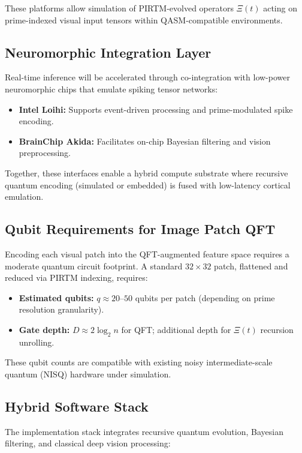 \documentclass[12pt]{article}
\theoremstyle{plain}
\begin{document}
These platforms allow simulation of PIRTM-evolved operators $\Xi(t)$ acting on prime-indexed visual input tensors within QASM-compatible environments.

\subsection*{Neuromorphic Integration Layer}

Real-time inference will be accelerated through co-integration with low-power neuromorphic chips that emulate spiking tensor networks:
\begin{itemize}
    \item \textbf{Intel Loihi:} Supports event-driven processing and prime-modulated spike encoding.
    \item \textbf{BrainChip Akida:} Facilitates on-chip Bayesian filtering and vision preprocessing.
\end{itemize}

Together, these interfaces enable a hybrid compute substrate where recursive quantum encoding (simulated or embedded) is fused with low-latency cortical emulation.

\subsection*{Qubit Requirements for Image Patch QFT}

Encoding each visual patch into the QFT-augmented feature space requires a moderate quantum circuit footprint. A standard $32 \times 32$ patch, flattened and reduced via PIRTM indexing, requires:
\begin{itemize}
    \item \textbf{Estimated qubits:} $q \approx 20$–$50$ qubits per patch (depending on prime resolution granularity).
    \item \textbf{Gate depth:} $D \approx 2 \log_2 n$ for QFT; additional depth for $\Xi(t)$ recursion unrolling.
\end{itemize}

These qubit counts are compatible with existing noisy intermediate-scale quantum (NISQ) hardware under simulation.

\subsection*{Hybrid Software Stack}

The implementation stack integrates recursive quantum evolution, Bayesian filtering, and classical deep vision processing:
\end{document}
